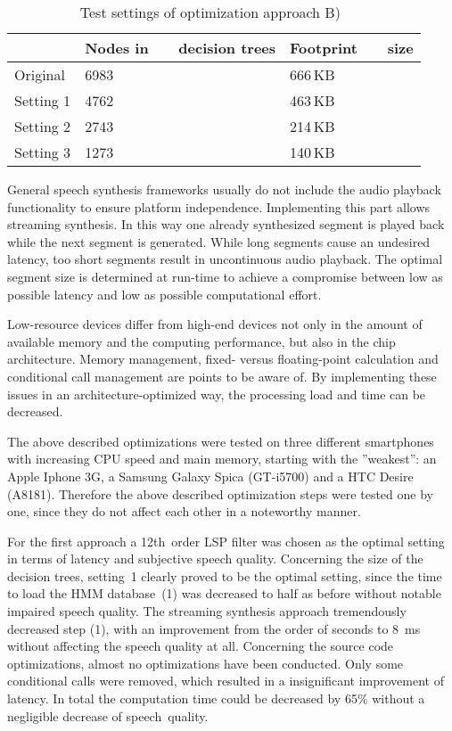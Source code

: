 \begin{table}[h]
	\caption{Test settings of optimization approach B)~\cite{toth:optimizing}}
	\vspace{-0.75em}
	\label{tab:settings}
	\begin{tabularx}{0.75\columnwidth}{lYY}
		\toprule
		\textbf{} & \textbf{Nodes in \ \ \ decision trees} & \textbf{Footprint \ \ \ size}\\
		\midrule
		Original & 6983 & 666\,KB\\[0.5em]
		Setting 1 & 4762 & 463\,KB\\[0.5em]
		Setting 2 & 2743 & 214\,KB\\[0.5em]
		Setting 3 & 1273 & 140\,KB\\
		\bottomrule
	\end{tabularx}
	\vspace{-0.5em}
\end{table}

General speech synthesis frameworks usually do not include the audio playback functionality to ensure platform independence. Implementing this part allows streaming synthesis. In this way one already synthesized segment is played back while the next segment is generated. While long segments cause an undesired latency, too short segments result in uncontinuous audio playback. The optimal segment size is determined at run-time to achieve a compromise between low as possible latency and low as possible \break computational effort.

Low-resource devices differ from high-end devices not only in the amount of available memory and the computing performance, but also in the chip architecture. Memory management, fixed- versus floating-point calculation and conditional call management are points to be aware of. By implementing these issues in an architecture-optimized way, the processing load and time can be decreased.

The above described optimizations were tested on three different smartphones with increasing CPU speed and main memory, starting with the ''weakest'': an Apple Iphone 3G, a Samsung Galaxy Spica (GT-i5700) and a HTC Desire (A8181). Therefore the above described optimization steps were tested one by one, since they do not affect each other in a noteworthy manner.

For the first approach a 12th~order \ac{LSP} filter was chosen as the optimal setting in terms of latency and subjective speech quality. Concerning the size of the decision trees, setting~1 clearly proved to be the optimal setting, since the time to load the \ac{HMM} database~(1) was decreased to half as before without notable impaired speech quality. The streaming synthesis approach tremendously decreased step (1), with an improvement from the order of seconds to 8~ms without affecting the speech quality at all. Concerning the source code optimizations, almost no optimizations have been conducted. Only some conditional calls were removed, which resulted in a insignificant improvement of latency. In total the computation time could be decreased by 65\% without a negligible decrease of speech~quality.


